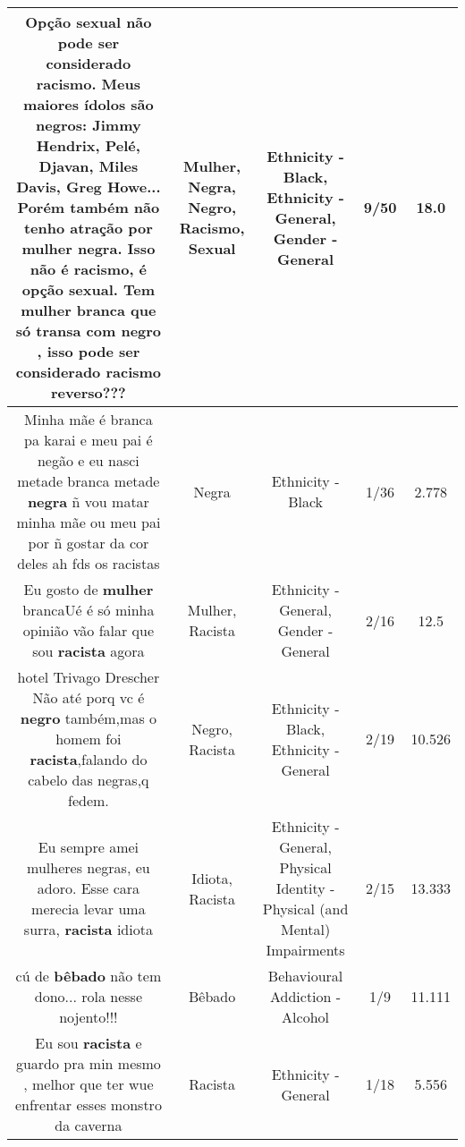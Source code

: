 \documentclass[11pt]{article}
\newlength\mylength
\begin{document}
\begin{center}
\begin{longtable}{|C{.65\mylength}|C{.30\mylength}|C{.12\mylength}|C{.12\mylength}|C{.12\mylength}|}
  \small Opção \textbf{sexual} não pode ser considerado \textbf{racismo}. Meus maiores ídolos são negros: Jimmy Hendrix, Pelé,  Djavan, Miles Davis, Greg Howe... Porém também não tenho atração por \textbf{mulher} \textbf{negra}. Isso não é \textbf{racismo}, é opção \textbf{sexual}. Tem \textbf{mulher} branca que só transa com \textbf{negro} , isso pode ser considerado \textbf{racismo} reverso???\normalsize   & Mulher, Negra, Negro, Racismo, Sexual & Ethnicity - Black, Ethnicity - General, Gender - General & 9/50 & 18.0 \\  \hline
  \small Minha mãe é branca pa karai e meu pai é negão e eu nasci metade branca metade \textbf{negra} ñ vou matar minha mãe ou meu pai por ñ gostar da cor deles ah fds os racistas\normalsize   & Negra & Ethnicity - Black & 1/36 & 2.778 \\  \hline
  \small Eu gosto de \textbf{mulher} brancaUé é só minha opinião vão falar que sou \textbf{racista} agora\normalsize   & Mulher, Racista & Ethnicity - General, Gender - General & 2/16 & 12.5 \\  \hline
  \small hotel Trivago Drescher Não até porq vc é \textbf{negro} também,mas o homem foi \textbf{racista},falando do cabelo das negras,q fedem.\normalsize   & Negro, Racista & Ethnicity - Black, Ethnicity - General & 2/19 & 10.526 \\  \hline
  \small Eu sempre amei mulheres negras, eu adoro. Esse cara merecia levar uma surra, \textbf{racista} idiota\normalsize   & Idiota, Racista & Ethnicity - General, Physical Identity - Physical (and Mental) Impairments & 2/15 & 13.333 \\  \hline
  \small cú de \textbf{bêbado} não tem dono... rola nesse nojento!!!\normalsize   & Bêbado & Behavioural Addiction - Alcohol & 1/9 & 11.111 \\  \hline
  \small Eu sou \textbf{racista} e guardo pra min mesmo , melhor que ter wue enfrentar esses monstro da caverna\normalsize   & Racista & Ethnicity - General & 1/18 & 5.556 \\  \hline

\end{longtable}
\end{center}
\end{document}
